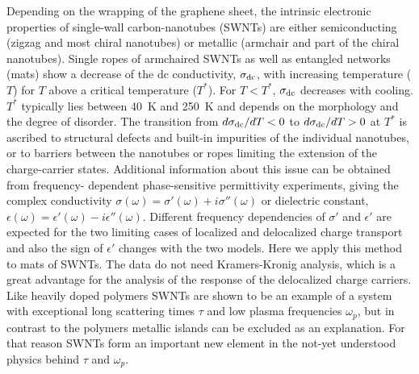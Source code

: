 \begin{multicols}{2}
\settowidth{\columnwidth}{aaaaaaaaaaaaaaaaaaaaaaaaaaaaaaaaaaaaaaaaaaaaaaaaaa}



Depending on the wrapping of the graphene sheet, the intrinsic
electronic properties of single-wall carbon-nanotubes (SWNTs) are
either semiconducting (zigzag and most chiral nanotubes) or metallic
(armchair and part of the chiral nanotubes)\cite{Hamada92,Wildoer98}.  Single
ropes of armchaired SWNTs as well as entangled networks (mats) show a
decrease of the dc conductivity, $\sigma_{\rm dc}$, with increasing
temperature ($T$) for $T$ above a critical temperature
($T^*$)\cite{Fischer97,Kane98,Kaiser98,Petit97}. For $T<T^*$,
$\sigma_{\rm dc}$ decreases with cooling. $T^*$ typically lies
between 40~K and 250~K and depends on the morphology and the degree
of disorder\cite{Kane98}. The transition from $d\sigma_{\rm dc}/dT
<0$ to $d\sigma_{\rm dc}/dT > 0$ at $T^*$ is ascribed to structural
defects and built-in impurities of the individual
nanotubes\cite{Fuhrer99,Lee97}, or to barriers between the nanotubes or
ropes limiting the extension of the charge-carrier states\cite{Kaiser98}.
Additional information about this issue can be obtained from frequency-
dependent phase-sensitive permittivity experiments, giving the complex
conductivity $\sigma(\omega)= \sigma'(\omega) + i\sigma''(\omega)$ or
dielectric constant, $\epsilon(\omega)=\epsilon'(\omega) -
i\epsilon''(\omega)$\cite{sigma}.  Different frequency dependencies of
$\sigma'$ and $\epsilon'$ are expected for the two limiting cases of
localized and delocalized charge transport and also the sign of $\epsilon'$
changes with the two models. Here we apply this method to mats of SWNTs. The
data do not need Kramers-Kronig analysis, which is a great advantage for the
analysis of the response of the delocalized charge carriers\cite{Chapman99}.
Like heavily doped polymers SWNTs are shown to be an example of a system with
exceptional long scattering times $\tau$ and low plasma frequencies
$\omega_p$, but in contrast to the polymers metallic islands can be excluded
as an explanation.  For that reason SWNTs form an important new element in
the not-yet understood physics behind $\tau$ and $\omega_p$.



\end{multicols}
